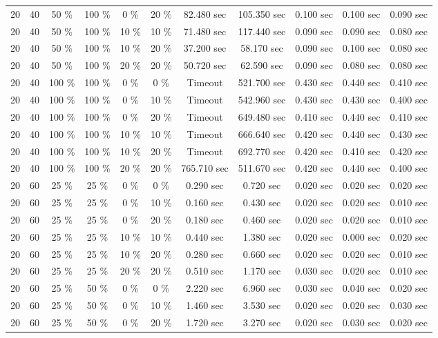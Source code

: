 \documentclass{article}
\begin{document}
\begin{longtable}[]{@{}ccccccccccc@{}}
20 & 40 & 50 \% & 100 \% & 0 \% & 20 \% & 82.480 sec & 105.350 sec & 0.100 sec & 0.100 sec & 0.090 sec \\
20 & 40 & 50 \% & 100 \% & 10 \% & 10 \% & 71.480 sec & 117.440 sec & 0.090 sec & 0.090 sec & 0.080 sec \\
20 & 40 & 50 \% & 100 \% & 10 \% & 20 \% & 37.200 sec & 58.170 sec & 0.090 sec & 0.100 sec & 0.080 sec \\
20 & 40 & 50 \% & 100 \% & 20 \% & 20 \% & 50.720 sec & 62.590 sec & 0.090 sec & 0.080 sec & 0.080 sec \\
20 & 40 & 100 \% & 100 \% & 0 \% & 0 \% & Timeout & 521.700 sec & 0.430 sec & 0.440 sec & 0.410 sec \\
20 & 40 & 100 \% & 100 \% & 0 \% & 10 \% & Timeout & 542.960 sec & 0.430 sec & 0.430 sec & 0.400 sec \\
20 & 40 & 100 \% & 100 \% & 0 \% & 20 \% & Timeout & 649.480 sec & 0.410 sec & 0.440 sec & 0.410 sec \\
20 & 40 & 100 \% & 100 \% & 10 \% & 10 \% & Timeout & 666.640 sec & 0.420 sec & 0.440 sec & 0.430 sec \\
20 & 40 & 100 \% & 100 \% & 10 \% & 20 \% & Timeout & 692.770 sec & 0.420 sec & 0.410 sec & 0.420 sec \\
20 & 40 & 100 \% & 100 \% & 20 \% & 20 \% & 765.710 sec & 511.670 sec & 0.420 sec & 0.440 sec & 0.400 sec \\
20 & 60 & 25 \% & 25 \% & 0 \% & 0 \% & 0.290 sec & 0.720 sec & 0.020 sec & 0.020 sec & 0.020 sec \\
20 & 60 & 25 \% & 25 \% & 0 \% & 10 \% & 0.160 sec & 0.430 sec & 0.020 sec & 0.020 sec & 0.010 sec \\
20 & 60 & 25 \% & 25 \% & 0 \% & 20 \% & 0.180 sec & 0.460 sec & 0.020 sec & 0.020 sec & 0.010 sec \\
20 & 60 & 25 \% & 25 \% & 10 \% & 10 \% & 0.440 sec & 1.380 sec & 0.020 sec & 0.000 sec & 0.020 sec \\
20 & 60 & 25 \% & 25 \% & 10 \% & 20 \% & 0.280 sec & 0.660 sec & 0.020 sec & 0.020 sec & 0.010 sec \\
20 & 60 & 25 \% & 25 \% & 20 \% & 20 \% & 0.510 sec & 1.170 sec & 0.030 sec & 0.020 sec & 0.010 sec \\
20 & 60 & 25 \% & 50 \% & 0 \% & 0 \% & 2.220 sec & 6.960 sec & 0.030 sec & 0.040 sec & 0.020 sec \\
20 & 60 & 25 \% & 50 \% & 0 \% & 10 \% & 1.460 sec & 3.530 sec & 0.020 sec & 0.020 sec & 0.030 sec \\
20 & 60 & 25 \% & 50 \% & 0 \% & 20 \% & 1.720 sec & 3.270 sec & 0.020 sec & 0.030 sec & 0.020 sec \\

\end{longtable}
\end{document}

